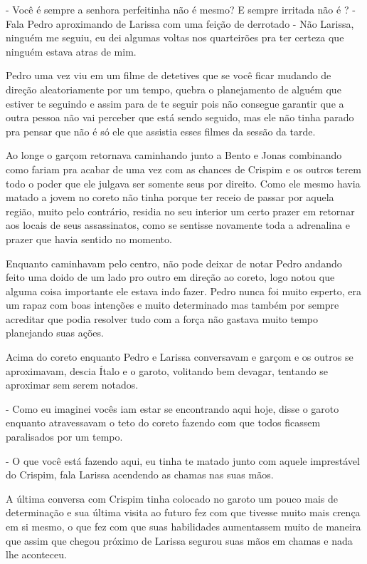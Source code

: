 - Você é sempre a senhora perfeitinha não é mesmo? E sempre irritada não é ? - Fala Pedro aproximando de Larissa com uma feição de derrotado  - Não Larissa, ninguém me seguiu, eu dei algumas voltas nos quarteirões pra ter certeza que ninguém estava atras de mim.

Pedro uma vez viu em um filme de detetives que se você ficar mudando de direção aleatoriamente por um tempo, quebra o planejamento de alguém que estiver te seguindo e assim para de te seguir pois não consegue garantir que a outra pessoa não vai perceber que está sendo seguido, mas ele não tinha parado pra pensar que não é só ele que assistia esses filmes da sessão da tarde.

Ao longe o garçom retornava caminhando junto a Bento e Jonas combinando como fariam pra acabar de uma vez com as chances de Crispim e os outros terem todo o poder que ele julgava ser somente seus por direito. Como ele mesmo havia matado a jovem no coreto não tinha porque ter receio de passar por aquela região, muito pelo contrário, residia no seu interior um certo prazer em retornar aos locais de seus assassinatos, como se sentisse novamente toda a adrenalina e prazer que havia sentido no momento.

Enquanto caminhavam pelo centro, não pode deixar de notar Pedro andando feito uma doido de um lado pro outro em direção ao coreto, logo notou que alguma coisa importante ele estava indo fazer. Pedro nunca foi muito esperto, era um rapaz com boas intenções e muito determinado mas também por sempre acreditar que podia resolver tudo com a força não gastava muito tempo planejando suas ações.

Acima do coreto enquanto Pedro e Larissa conversavam e garçom e os outros se aproximavam, descia Ítalo e o garoto, volitando bem devagar, tentando se aproximar sem serem notados.

- Como eu imaginei vocês iam estar se encontrando aqui hoje, disse o garoto enquanto atravessavam o teto do coreto fazendo com que todos ficassem paralisados por um tempo.

- O que você está fazendo aqui, eu tinha te matado junto com aquele imprestável do Crispim, fala Larissa acendendo as chamas nas suas mãos.

A última conversa com Crispim tinha colocado no garoto um pouco mais de determinação e sua última visita ao futuro fez com que tivesse muito mais crença em si mesmo, o que fez com que suas habilidades aumentassem muito de maneira que assim que chegou próximo de Larissa segurou suas mãos em chamas e nada lhe aconteceu.

